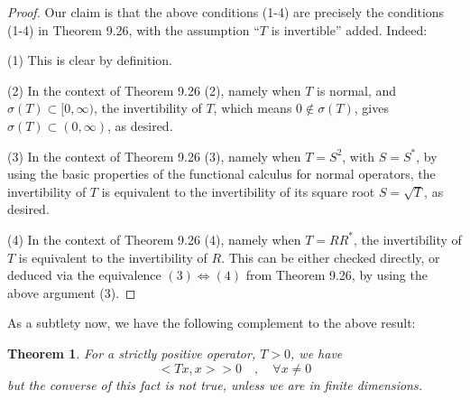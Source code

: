 \documentclass[12pt]{amsbook}
\newtheorem{theorem}{Theorem}[chapter]
\begin{document}
\begin{proof}
Our claim is that the above conditions (1-4) are precisely the conditions (1-4) in Theorem 9.26, with the assumption ``$T$ is invertible'' added. Indeed:

\medskip

(1) This is clear by definition.

\medskip

(2) In the context of Theorem 9.26 (2), namely when $T$ is normal, and $\sigma(T)\subset[0,\infty)$, the invertibility of $T$, which means $0\notin\sigma(T)$, gives $\sigma(T)\subset(0,\infty)$, as desired.

\medskip

(3) In the context of Theorem 9.26 (3), namely when $T=S^2$, with $S=S^*$, by using the basic properties of the functional calculus for normal operators, the invertibility of $T$ is equivalent to the invertibility of its square root $S=\sqrt{T}$, as desired.

\medskip

(4) In the context of Theorem 9.26 (4), namely when $T=RR^*$, the invertibility of $T$ is equivalent to the invertibility of $R$. This can be either checked directly, or deduced via the equivalence $(3)\iff(4)$ from Theorem 9.26, by using the above argument (3).
\end{proof}

As a subtlety now, we have the following complement to the above result:

\begin{theorem}
For a strictly positive operator, $T>0$, we have
$$<Tx,x>>0\quad,\quad\forall x\neq0$$
but the converse of this fact is not true, unless we are in finite dimensions.
\end{theorem}
\end{document}
